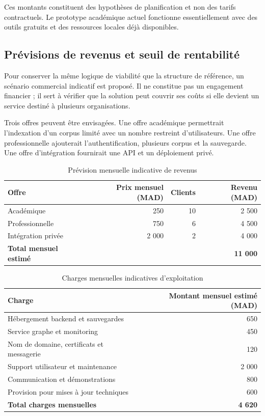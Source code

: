 \documentclass[12pt,a4paper,oneside]{report}
\begin{document}
Ces montants constituent des hypothèses de planification et non des tarifs contractuels. Le prototype académique actuel fonctionne essentiellement avec des outils gratuits et des ressources locales déjà disponibles.

\subsection{Prévisions de revenus et seuil de rentabilité}
Pour conserver la même logique de viabilité que la structure de référence, un scénario commercial indicatif est proposé. Il ne constitue pas un engagement financier ; il sert à vérifier que la solution peut couvrir ses coûts si elle devient un service destiné à plusieurs organisations.

Trois offres peuvent être envisagées. Une offre académique permettrait l'indexation d'un corpus limité avec un nombre restreint d'utilisateurs. Une offre professionnelle ajouterait l'authentification, plusieurs corpus et la sauvegarde. Une offre d'intégration fournirait une API et un déploiement privé.

\begin{table}[H]
\centering
\caption{Prévision mensuelle indicative de revenus}
\begin{tabularx}{0.92\textwidth}{Xrrr}
\toprule
\textbf{Offre} & \textbf{Prix mensuel (MAD)} & \textbf{Clients} & \textbf{Revenu (MAD)}\\
\midrule
Académique & 250 & 10 & 2 500\\
Professionnelle & 750 & 6 & 4 500\\
Intégration privée & 2 000 & 2 & 4 000\\
\midrule
\textbf{Total mensuel estimé} & & & \textbf{11 000}\\
\bottomrule
\end{tabularx}
\end{table}

\begin{table}[H]
\centering
\caption{Charges mensuelles indicatives d'exploitation}
\begin{tabularx}{0.92\textwidth}{Xr}
\toprule
\textbf{Charge} & \textbf{Montant mensuel estimé (MAD)}\\
\midrule
Hébergement backend et sauvegardes & 650\\
Service graphe et monitoring & 450\\
Nom de domaine, certificats et messagerie & 120\\
Support utilisateur et maintenance & 2 000\\
Communication et démonstrations & 800\\
Provision pour mises à jour techniques & 600\\
\midrule
\textbf{Total charges mensuelles} & \textbf{4 620}\\
\bottomrule
\end{tabularx}
\end{table}
\end{document}
